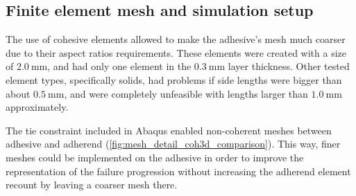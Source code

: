 \documentclass[cmfonts]{witpress}
\begin{document}
\subsection{Finite element mesh and simulation setup}

The use of cohesive elements allowed to make the adhesive's mesh much coarser due to their aspect ratios requirements. These elements were created with a size of $\SI{2.0}{\mm}$, and had only one element in the $\SI{0.3}{\mm}$ layer thickness. Other tested element types, specifically solids, had problems if side lengths were bigger than about $\SI{0.5}{\mm}$, and were completely unfeasible with lengths larger than $\SI{1.0}{\mm}$ approximately.

The tie constraint included in Abaqus enabled non-coherent meshes between adhesive and adherend (\cref{fig:mesh_detail_coh3d_comparison}). This way, finer meshes could be implemented on the adhesive in order to improve the representation of the failure progression without increasing the adherend element recount by leaving a coarser mesh there.
\end{document}
